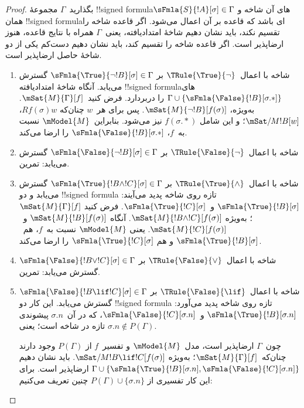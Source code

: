 \documentclass[../../../include/open-logic-section]{subfiles}
\begin{document}
\begin{proof}
بگذارید~$\Gamma$ مجموعهٔ !!{signed formula}های آن شاخه و
$\sFmla{S}{!A}[\sigma] \in \Gamma$ همان !!{signed formula}ای باشد که
قاعده بر آن اعمال می‌شود. اگر قاعده شاخه را تقسیم نکند، باید نشان دهیم
شاخهٔ امتدادیافته، یعنی~$\Gamma$ همراه با نتایج قاعده، هنوز ارضاپذیر
است. اگر قاعده شاخه را تقسیم کند، باید نشان دهیم دست‌کم یکی از دو شاخهٔ
حاصل ارضاپذیر است.
\begin{enumerate}
\item شاخه با اعمال~$\TRule{\True}{\lnot}$ بر
  $\sFmla{\True}{\lnot !B}[\sigma] \in \Gamma$ گسترش می‌یابد. آنگاه
  شاخهٔ امتدادیافته !!{signed formula}های
  $\Gamma \cup \{\sFmla{\False}{!B}[\sigma.{*}]\}$ را دربردارد. فرض
  کنید~$\mSat{M}{\Gamma}[f]$. به‌ویژه،
  $\mSat{M}{\lnot !B}[f(\sigma)]$. پس برای هر~$w$ چنان‌که
  $Rf(\sigma)w$، $\mSat/{M}{!B}[w]$؛ و این شامل
  $f(\sigma.{*})$ نیز می‌شود. بنابراین~$\mModel{M}$ نسبت به~$f$،
  $\sFmla{\False}{!B}[\sigma.{*}]$ را ارضا می‌کند.
\item شاخه با اعمال~$\TRule{\False}{\lnot}$ بر
  $\sFmla{\False}{\lnot !B}[\sigma] \in \Gamma$ گسترش می‌یابد: تمرین.
\item شاخه با اعمال~$\TRule{\True}{\land}$ بر
  $\sFmla{\True}{!B \land !C}[\sigma] \in \Gamma$ گسترش می‌یابد و دو
  !!{signed formula} تازه روی شاخه پدید می‌آیند:
  $\sFmla{\True}{!B}[\sigma]$ و~$\sFmla{\True}{!C}[\sigma]$. فرض کنید
  $\mSat{M}{\Gamma}[f]$؛ به‌ویژه
  $\mSat{M}{!B \land !C}[f(\sigma)]$. آنگاه
  $\mSat{M}{!B}[f(\sigma)]$ و~$\mSat{M}{!C}[f(\sigma)]$. یعنی
  $\mModel{M}$ نسبت به~$f$، هم~$\sFmla{\True}{!B}[\sigma]$ و هم
  $\sFmla{\True}{!C}[\sigma]$ را ارضا می‌کند.
\item شاخه با اعمال~$\TRule{\False}{\lor}$ بر
  $\sFmla{\False}{!B \lor !C}[\sigma] \in \Gamma$ گسترش می‌یابد: تمرین.
\item شاخه با اعمال~$\TRule{\False}{\lif}$ بر
  $\sFmla{\False}{!B \lif !C}[\sigma] \in \Gamma$ گسترش می‌یابد. این
  کار دو !!{signed formula} تازه روی شاخه پدید می‌آورد:
  $\sFmla{\True}{!B}[\sigma.n]$ و~$\sFmla{\False}{!C}[\sigma.n]$، که
  در آن~$\sigma.n$ پیشوندی تازه در شاخه است؛ یعنی
  $\sigma.n \notin P(\Gamma)$.
  
  چون~$\Gamma$ ارضاپذیر است، مدل~$\mModel{M}$ و تفسیر~$f$ از
  $P(\Gamma)$ وجود دارند چنان‌که~$\mSat{M}{\Gamma}[f]$؛ به‌ویژه
  $\mSat/{M}{!B \lif !C}[f(\sigma)]$. باید نشان دهیم
  $\Gamma \cup \{\sFmla{\True}{!B}[\sigma.n],
  \sFmla{\False}{!C}[\sigma.n]\}$ ارضاپذیر است. برای این کار تفسیری از
  $P(\Gamma) \cup \{\sigma.n\}$ چنین تعریف می‌کنیم:
  

\end{enumerate}
\end{proof}
\end{document}
